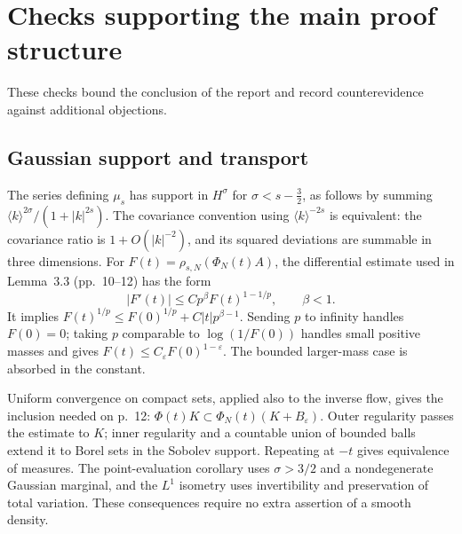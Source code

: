 \documentclass[10pt]{article}
\begin{document}
\section*{Checks supporting the main proof structure}
These checks bound the conclusion of the report and record counterevidence against additional objections.\par
\subsection*{Gaussian support and transport}
The series defining \(\mu_s\) has support in \(H^\sigma\) for \(\sigma<s-\tfrac32\), as follows by summing \(\langle k\rangle^{2\sigma}/(1+|k|^{2s})\). The covariance convention using \(\langle k\rangle^{-2s}\) is equivalent: the covariance ratio is \(1+O(|k|^{-2})\), and its squared deviations are summable in three dimensions. For \(F(t)=\rho_{s,N}(\Phi_N(t)A)\), the differential estimate used in Lemma 3.3 (pp. 10–12) has the form \[|F'(t)|\leq C p^\beta F(t)^{1-1/p},\qquad \beta<1.\] It implies \(F(t)^{1/p}\leq F(0)^{1/p}+C|t|p^{\beta-1}\). Sending \(p\) to infinity handles \(F(0)=0\); taking \(p\) comparable to \(\log(1/F(0))\) handles small positive masses and gives \(F(t)\leq C_\varepsilon F(0)^{1-\varepsilon}\). The bounded larger-mass case is absorbed in the constant.\par
Uniform convergence on compact sets, applied also to the inverse flow, gives the inclusion needed on p. 12: \(\Phi(t)K\subset\Phi_N(t)(K+B_\varepsilon)\). Outer regularity passes the estimate to \(K\); inner regularity and a countable union of bounded balls extend it to Borel sets in the Sobolev support. Repeating at \(-t\) gives equivalence of measures. The point-evaluation corollary uses \(\sigma>3/2\) and a nondegenerate Gaussian marginal, and the \(L^1\) isometry uses invertibility and preservation of total variation. These consequences require no extra assertion of a smooth density.\par
\end{document}
